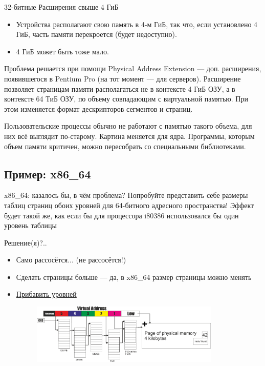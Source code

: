 \documentclass[xetex,aspectratio=43]{beamer}
\begin{document}
\begin{frame}{32-битные Расширения свыше 4 ГиБ}
    \begin{itemize}
        \item
        Устройства располагают свою память в 4-м ГиБ, так что, если
        установлено 4 ГиБ, часть памяти перекроется (будет недоступно).
        \item
        4 ГиБ может быть тоже мало.
    \end{itemize}

    Проблема решается при помощи Physical Address Extension --- доп.
    расширения, появившегося в Pentium Pro (на тот момент --- для серверов).
    Расширение позволяет страницам памяти располагаться не в контексте 4 ГиБ
    ОЗУ, а в контексте 64 ТиБ ОЗУ, по объему совпадающим с виртуальной
    памятью. При этом изменяется формат дескрипторов сегментов и страниц.

    Пользовательские процессы обычно не работают с памятью такого объема,
    для них всё выглядит по-старому. Картина меняется для ядра. Программы,
    которым объем памяти критичен, можно пересобрать со специальными
    библиотеками.
\end{frame}

\subsection{Пример: x86\_64}

\begin{frame}{x86\_64: казалось бы, в чём проблема?}
    Попробуйте представить себе размеры таблиц страниц обоих уровней для 64-битного адресного пространства! Эффект будет такой же, как если бы для процессора i80386 использовался бы один уровень таблицы

    Решение(я)?..

    \begin{itemize}
        \pause
        \item Само рассосётся... (не рассосётся!) %
        \pause
        \item Сделать страницы больше --- да, в x86\_64 размер страницы можно менять
        \pause
        \item \href{https://en.wikipedia.org/wiki/Intel_5-level_paging}{Прибавить уровней}
        \begin{figure}
            \includegraphics[width=0.85\textwidth]{img/06.Page_Tables_5_levels.pdf}
        \end{figure}
    \end{itemize}



\end{frame}
\end{document}
